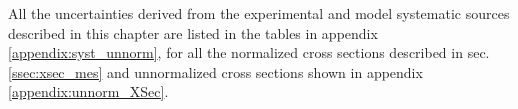 All the uncertainties derived from the experimental and model systematic sources described in this chapter are listed in the tables in appendix \ref{appendix:syst_unnorm},
for all the normalized cross sections described in sec. \ref{ssec:xsec_mes} and unnormalized cross sections shown in appendix \ref{appendix:unnorm_XSec}. 
% 
% 
% 
% 
% 
% 
% 
% 
% 
% 
% 
% 
% 
% 
% 
% 
% 
% 
% 
% 
% 
% 
% 
% 
% 
% 
% 
% 
% 
% 
% 
